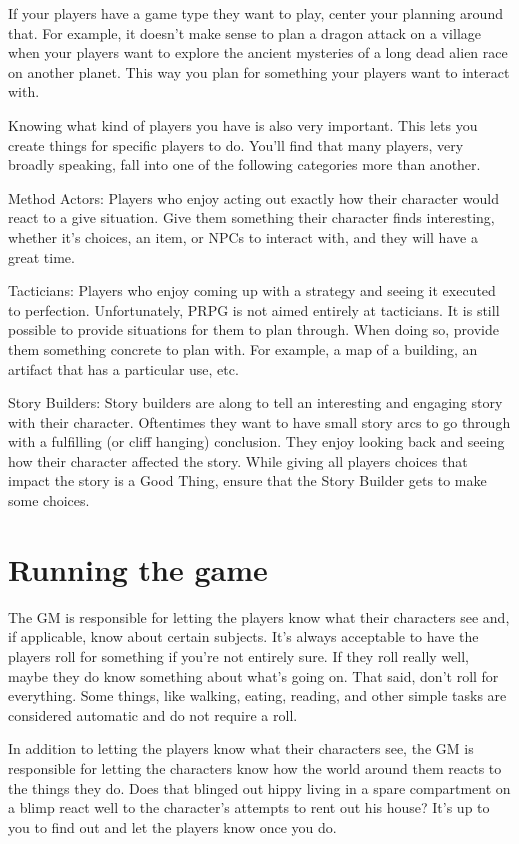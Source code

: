 \begin{flushleft}
If your players have a game type they want to play, center your planning around
that. For example, it doesn't make sense to plan a dragon attack on a village
when your players want to explore the ancient mysteries of a long dead alien
race on another planet. This way you plan for something your players want to
interact with.

Knowing what kind of players you have is also very important. This lets you
create things for specific players to do. You'll find that many players, very
broadly speaking, fall into one of the following categories more than another.

Method Actors: Players who enjoy acting out exactly how their character would
react to a give situation. Give them something their character finds
interesting, whether it's choices, an item, or NPCs to interact with, and they
will have a great time.

Tacticians: Players who enjoy coming up with a strategy and seeing it executed
to perfection. Unfortunately, PRPG is not aimed entirely at tacticians. It is
still possible to provide situations for them to plan through. When doing so,
provide them something concrete to plan with. For example, a map of a building,
an artifact that has a particular use, etc.

Story Builders: Story builders are along to tell an interesting and engaging
story with their character. Oftentimes they want to have small story arcs to
go through with a fulfilling (or cliff hanging) conclusion. They enjoy looking
back and seeing how their character affected the story. While giving all players
choices that impact the story is a Good Thing, ensure that the Story Builder
gets to make some choices.

\section*{Running the game}

The GM is responsible for letting the players know what their characters see
and, if applicable, know about certain subjects. It's always acceptable to
have the players roll for something if you're not entirely sure. If they roll
really well, maybe they do know something about what's going on. That said,
don't roll for everything. Some things, like walking, eating, reading, and
other simple tasks are considered automatic and do not require a roll.

In addition to letting the players know what their characters see, the GM is
responsible for letting the characters know how the world around them reacts
to the things they do. Does that blinged out hippy living in a spare
compartment on a blimp react well to the character's attempts to rent out his
house? It's up to you to find out and let the players know once you do.


\end{flushleft}
